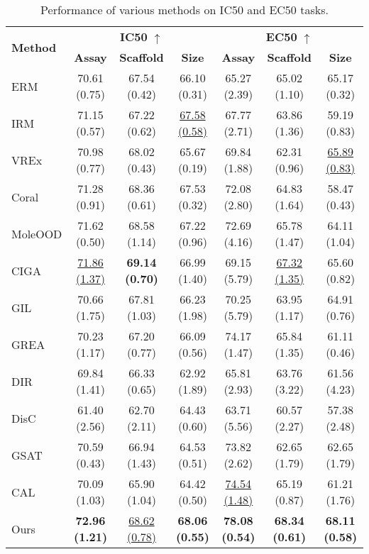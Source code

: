 \begin{table}[ht] \label{table_1}
\centering
\caption{Performance of various methods on IC50 and EC50 tasks.}
\begin{tabular}{l|ccc|ccc}
\hline
\multirow{2}{*}{\textbf{Method}} & \multicolumn{3}{c|}{\textbf{IC50} $\uparrow$} & \multicolumn{3}{c}{\textbf{EC50} $\uparrow$} \\ 
 & \textbf{Assay} & \textbf{Scaffold} & \textbf{Size} & \textbf{Assay} & \textbf{Scaffold} & \textbf{Size} \\ \hline
ERM & 70.61 (0.75) & 67.54 (0.42) & 66.10 (0.31) & 65.27 (2.39) & 65.02 (1.10) & 65.17 (0.32) \\ 
IRM & 71.15 (0.57) & 67.22 (0.62) & \underline{67.58 (0.58)} & 67.77 (2.71) & 63.86 (1.36) & 59.19 (0.83) \\ 
VREx & 70.98 (0.77) & 68.02 (0.43) & 65.67 (0.19) & 69.84 (1.88) & 62.31 (0.96) & \underline{65.89 (0.83)} \\ 
Coral & 71.28 (0.91) & 68.36 (0.61) & 67.53 (0.32) & 72.08 (2.80) & 64.83 (1.64) & 58.47 (0.43) \\ \hline
MoleOOD & 71.62 (0.50) & 68.58 (1.14) & 67.22 (0.96) & 72.69 (4.16) & 65.78 (1.47) & 64.11 (1.04) \\ 
CIGA & \underline{71.86 (1.37)} & \textbf{69.14 (0.70)} & 66.99 (1.40) & 69.15 (5.79) & \underline{67.32 (1.35)} & 65.60 (0.82) \\ 
GIL & 70.66 (1.75) & 67.81 (1.03) & 66.23 (1.98) & 70.25 (5.79) & 63.95 (1.17) & 64.91 (0.76) \\ 
GREA & 70.23 (1.17) & 67.20 (0.77) & 66.09 (0.56) & 74.17 (1.47) & 65.84 (1.35) & 61.11 (0.46) \\  \hline
DIR & 69.84 (1.41) & 66.33 (0.65) & 62.92 (1.89) & 65.81 (2.93) & 63.76 (3.22) & 61.56 (4.23) \\ 
DisC & 61.40 (2.56) & 62.70 (2.11) & 64.43 (0.60) & 63.71 (5.56) & 60.57 (2.27) & 57.38 (2.48) \\ \hline
GSAT & 70.59 (0.43) & 66.94 (1.43) & 64.53 (0.51) & 73.82 (2.62) & 62.65 (1.79) & 62.65 (1.79) \\ 
CAL & 70.09 (1.03) & 65.90 (1.04) & 64.42 (0.50) & \underline{74.54 (1.48)} & 65.19 (0.87) & 61.21 (1.76) 
\\ \hline
Ours & \textbf{72.96 (1.21)} & \underline{68.62 (0.78)} & \textbf{68.06 (0.55)} & \textbf{78.08 (0.54)} & \textbf{68.34 (0.61)} & \textbf{68.11 (0.58)} \\ \hline
\end{tabular}
\end{table}

